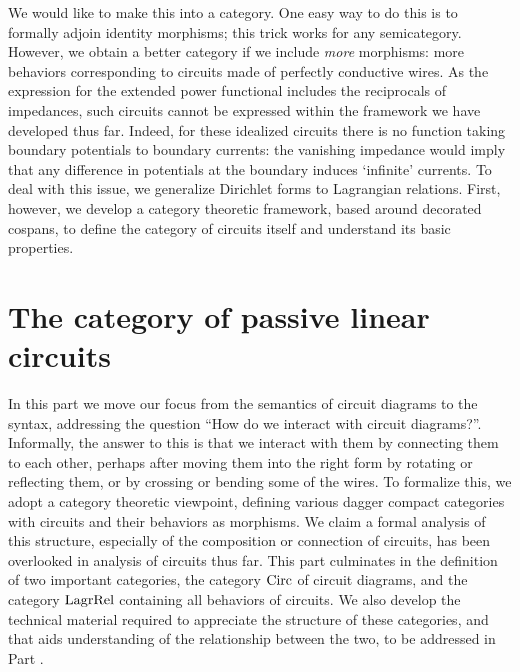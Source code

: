 We would like to make this into a category. One easy way to do this is to
formally adjoin identity morphisms; this trick works for any semicategory.
However, we obtain a better category if we include \emph{more} morphisms: more
behaviors corresponding to circuits made of perfectly conductive wires. As the
expression for the extended power functional includes the reciprocals of
impedances, such circuits cannot be expressed within the framework we have
developed thus far. Indeed, for these idealized circuits there is no function
taking boundary potentials to boundary currents: the vanishing impedance would
imply that any difference in potentials at the boundary induces `infinite'
currents. To deal with this issue, we generalize Dirichlet forms to Lagrangian
relations.  First, however, we develop a category theoretic framework, based
around decorated cospans, to define the category of circuits itself and
understand its basic properties.

\section{The category of passive linear circuits} \label{sec:circdef}
In this part we move our focus from the semantics of circuit diagrams to the
syntax, addressing the question ``How do we interact with circuit diagrams?''.
Informally, the answer to this is that we interact with them by connecting them
to each other, perhaps after moving them into the right form by rotating or
reflecting them, or by crossing or bending some of the wires. To formalize this,
we adopt a category theoretic viewpoint, defining various dagger compact
categories with circuits and their behaviors as morphisms. We claim a formal
analysis of this structure, especially of the composition or connection of
circuits, has been overlooked in analysis of circuits thus far. This part
culminates in the definition of two important categories, the category $\mathrm{Circ}$
of circuit diagrams, and the category $\mathrm{LagrRel}$ containing all behaviors of
circuits. We also develop the technical material required to appreciate the
structure of these categories, and that aids understanding of the relationship
between the two, to be addressed in Part .

